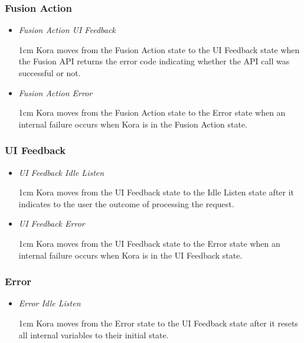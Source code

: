 \documentclass[onecolumn, draftclsnofoot,10pt, compsoc]{IEEEtran}
\def \botname{Kora\xspace}
\newenvironment{indentItem}[1][1cm]{\begin{adjustwidth}{#1}{}}{\end{adjustwidth}}
\begin{document}
		\subsubsection{Fusion Action}
		\begin{itemize}
			\item \textit{Fusion Action \textrightarrow{} UI Feedback}
			\begin{indentItem}
				\botname moves from the Fusion Action state to the UI Feedback state when the Fusion API returns the error code indicating whether the API call was successful or not.
			\end{indentItem}
			\item \textit{Fusion Action \textrightarrow{} Error}
			\begin{indentItem}
				\botname moves from the Fusion Action state to the Error state when an internal failure occurs when \botname is in the Fusion Action state.
			\end{indentItem}
		\end{itemize}
		
		\subsubsection{UI Feedback}
		\begin{itemize}
			\item \textit{UI Feedback \textrightarrow{} Idle Listen}
			\begin{indentItem}
				\botname moves from the UI Feedback state to the Idle Listen state after it indicates to the user the outcome of processing the request.
			\end{indentItem}
			\item \textit{UI Feedback \textrightarrow{} Error}
			\begin{indentItem}
				\botname moves from the UI Feedback state to the Error state when an internal failure occurs when \botname is in the UI Feedback state.
			\end{indentItem}
		\end{itemize}
		
		\subsubsection{Error}
		\begin{itemize}
			\item \textit{Error \textrightarrow{} Idle Listen}
			\begin{indentItem}
				\botname moves from the Error state to the UI Feedback state after it resets all internal variables to their initial state.
			\end{indentItem}
		\end{itemize}
\end{document}
